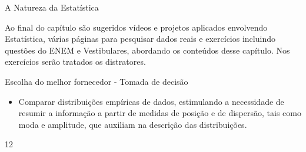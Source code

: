 \begin{apresentacao}{A Natureza da Estatística}
\begin{enumerate}
\end{enumerate}

Ao final do capítulo são sugeridos vídeos e projetos aplicados envolvendo  Estatística, várias páginas para pesquisar dados reais e exercícios incluindo questões do ENEM e Vestibulares, abordando os conteúdos desse capítulo. Nos exercícios serão tratados os distratores.

\end{apresentacao}


\def\currentcolor{session1}
\clearmargin
\begin{objectives}{Escolha do melhor fornecedor - Tomada de decisão}
{
\begin{itemize}

\item Comparar distribuições empíricas de dados, estimulando a necessidade de resumir a informação a partir de medidas de posição e de dispersão, tais como moda e amplitude, que auxiliam na descrição das distribuições.

\end{itemize}
}{1}{2}
\end{objectives}
